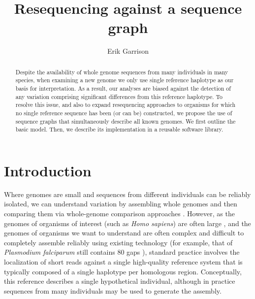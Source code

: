 \documentclass{article}
\begin{document}
\title{Resequencing against a sequence graph}

\author{Erik Garrison}

\maketitle

\begin{abstract}
Despite the availability of whole genome sequences from many individuals in many species, when examining a new genome we only use single reference haplotype as our basis for interpretation. As a result, our analyses are biased against the detection of any variation comprising significant differences from this reference haplotype. To resolve this issue, and also to expand resequencing approaches to organisms for which no single reference sequence has been (or can be) constructed, we propose the use of sequence graphs that simultaneously describe all known genomes. We first outline the basic model. Then, we describe its implementation in a reusable software library.
\end{abstract}

\section{Introduction}

Where genomes are small and sequences from different individuals can be reliably isolated, we can understand variation by assembling whole genomes and then comparing them via whole-genome comparison approaches \cite{mummer}.
However, as the genomes of organisms of interest (such as \emph{Homo sapiens}) are often large \cite{pmid11237011}, and the genomes of organisms we want to understand are often complex and difficult to completely assemble reliably using existing technology (for example, that of \emph{Plasmodium falciparum} still contains 80 gaps \cite{pfalciparum, pfalciparumweb}), standard practice involves the localization of short reads against a single high-quality reference system that is typically composed of a single haplotype per homologous region. Conceptually, this reference describes a single hypothetical individual, although in practice sequences from many individuals may be used to generate the assembly.
\end{document}
